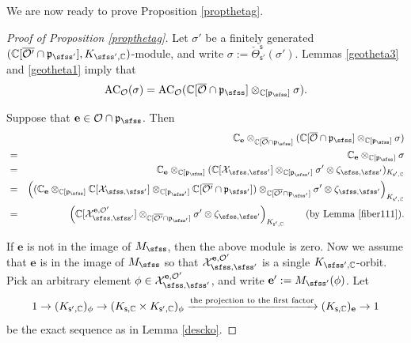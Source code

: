 \documentclass[11pt,a4paper]{amsart}
\newcommand{\CO}{{\mathcal {O}}}
\newcommand{\CX}{{\mathcal {X}}}
\newcommand{\p}{\mathfrak p}
\numberwithin{equation}{section}
\theoremstyle{remark}
\begin{document}
We are now ready to prove Proposition \ref{propthetag}.

\begin{proof}[Proof of Proposition \ref{propthetag}]
Let  $\sigma'$ be a finitely generated  $(\C[\overline{\CO'}\cap \p_{\sfss'}], K_{\sfss', \C})$-module, and write  $\sigma:=\check \Theta_{\mathsf s'}^{\mathsf s}(\sigma')$.
 Lemmas \ref{geotheta3} and \ref{geotheta1} imply that
\[
  \mathrm{AC}_{\CO}(\sigma)=\mathrm{AC}_{\CO}(\C[\overline \CO\cap \p_{\sfss}]\otimes_{\C[\p_{\sfss}]} \sigma).
\]

Suppose that $\mathbf e\in \CO\cap \p_\sfss$. Then
\begin{eqnarray*}
  && \C_\mathbf e \otimes_{\C[\overline \CO\cap \p_{\sfss}]} (\C[\overline \CO\cap \p_{\sfss}]\otimes_{\C[\p_{\sfss}]} \sigma)\\
  &=&  \C_\mathbf e \otimes_{\C[\p_{\sfss}]} \sigma\\
  &=&  \C_\mathbf e \otimes_{\C[\p_{\sfss}]} (\C[\CX_{\sfss, \sfss'}]\otimes_{\C[\p_{\sfss'}]} \sigma'\otimes \zeta_{\sfss, \sfss'})_{K_{\mathsf s', \C}} \\
   &=&\left( (\C_\mathbf e \otimes_{\C[\p_{\sfss}]} \C[\CX_{\sfss, \sfss'}]\otimes_{\C[\p_{\sfss'}]} \C[\overline{\CO'}\cap \p_{\sfss'}]) \otimes_{\C[\overline{\CO'}\cap \p_{\sfss'}]}\sigma'\otimes \zeta_{\sfss, \sfss'}\right)_{K_{\mathsf s', \C}} \\
      &=&\left( \C[\CX_{\sfss, \sfss'}^{\mathbf e, \CO'}] \otimes_{\C[\overline{\CO'}\cap \p_{\sfss'}]}\sigma'\otimes \zeta_{\sfss, \sfss'}\right)_{K_{\mathsf s', \C}} \qquad (\textrm{by Lemma \ref{fiber111}}).
\end{eqnarray*}

If $\mathbf e$ is not in the image of $M_\sfss$, then the above module is zero. Now we assume that $\mathbf e$ is in the image of $M_\sfss$ so that $\CX_{\sfss, \sfss'}^{\mathbf e, \CO'}$ is a single $K_{\sfss',\C}$-orbit. Pick an arbitrary element $\phi\in \CX_{\sfss, \sfss'}^{\mathbf e, \CO'}$, and write $\mathbf e':=M_{\sfss'}(\phi)$. Let
\[
  1\rightarrow  (K_{\mathsf s',\mathbb{C}})_\phi \rightarrow (K_{\mathsf s,\mathbb{C}}\times K_{\mathsf s', \mathbb{C}})_\phi\xrightarrow{\textrm{the projection to the first factor}} (K_{\mathsf s,\mathbb{C}})_{\mathbf e}\rightarrow 1
\]
be the exact  sequence as in Lemma \ref{descko}. 



\end{proof}
\end{document}
